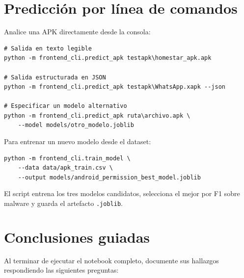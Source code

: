 \documentclass[
  coursetitle={Cómputo Nube y Tecnologías Emergentes},
  coursehours={96},
  coursedate={Verano 2026},
  doctype={Tutorial},
  otherlangs={english,french},
  authorname={Lázaro},
  authorsurname={Bustio-Martínez},
  authortitle={PhD},
  role={Profesor Investigador},
  email={lbustio@inaoe.mx},
  phone={5559504000},
  ext={7459},
  institution={Instituto Nacional de Astrofísica, Óptica y Electrónica (INAOE)},
  department={Maestría en Ciencias en Tecnologías de Seguridad},
  address={Luis Enrique Erro 1, Sta. Ma. Tonantzintla, San Andrés Cholula, CP 72840, Puebla, México},
  margin={0.5in}
]{../../lbustio_lecture_notes}
\begin{document}
\section{Predicción por línea de comandos}

Analice una APK directamente desde la consola:

\begin{lstlisting}
# Salida en texto legible
python -m frontend_cli.predict_apk testapk\homestar_apk.apk

# Salida estructurada en JSON
python -m frontend_cli.predict_apk testapk\WhatsApp.xapk --json

# Especificar un modelo alternativo
python -m frontend_cli.predict_apk ruta\archivo.apk \
    --model models/otro_modelo.joblib
\end{lstlisting}

Para entrenar un nuevo modelo desde el dataset:

\begin{lstlisting}
python -m frontend_cli.train_model \
    --data data/apk_train.csv \
    --output models/android_permission_best_model.joblib
\end{lstlisting}

El script entrena los tres modelos candidatos, selecciona el mejor por F1 sobre malware y guarda el artefacto \texttt{.joblib}.

\section{Conclusiones guiadas}

Al terminar de ejecutar el notebook completo, documente sus hallazgos respondiendo las siguientes preguntas:
\end{document}
